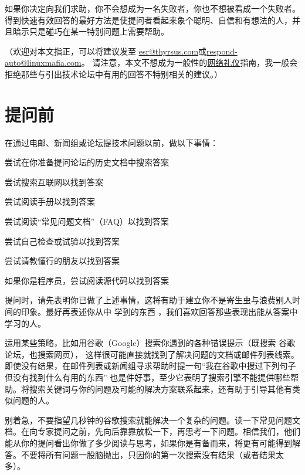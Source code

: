 如果你决定向我们求助，你不会想成为一名失败者，你也不想被看成一个失败者。得到快速有效回答的最好方法是使提问者看起来象个聪明、自信和有想法的人，并且暗示只是碰巧在某一特别问题上需要帮助。

（欢迎对本文指正，可以将建议发至 \href{mailto:esr@thyrsus.com}{esr@thyrsus.com}或\href{mailto:esr@thyrsus.com}{respond-auto@linuxmafia.com}。 请注意，本文不想成为一般性的\href{http://www.ietf.org/rfc/rfc1855.txt}{网络礼仪}指南，我一般会拒绝那些与引出技术论坛中有用的回答不特别相关的建议。）




\section{提问前}


在通过电邮、新闻组或论坛提技术问题以前，做以下事情：

\begin{compactenum}
\item 尝试在你准备提问论坛的历史文档中搜索答案
\item 尝试搜索互联网以找到答案
\item 尝试阅读手册以找到答案
\item 尝试阅读“常见问题文档”（FAQ）以找到答案
\item 尝试自己检查或试验以找到答案
\item 尝试请教懂行的朋友以找到答案
\item 如果你是程序员，尝试阅读源代码以找到答案
\end{compactenum}



提问时，请先表明你已做了上述事情，这将有助于建立你不是寄生虫与浪费别人时间的印象。最好再表述你从中 学到的东西 ，我们喜欢回答那些表现出能从答案中学习的人。

运用某些策略，比如用谷歌（Google）搜索你遇到的各种错误提示（既搜索 谷歌论坛，也搜索网页）， 这样很可能直接就找到了解决问题的文档或邮件列表线索。 即使没有结果，在邮件列表或新闻组寻求帮助时提一句“我在谷歌中搜过下列句子但没有找到什么有用的东西” 也是件好事，至少它表明了搜索引擎不能提供哪些帮助。将搜索关键词与你的问题及可能的解决方案联系起来，还有助于引导其他有类似问题的人。

别着急，不要指望几秒钟的谷歌搜索就能解决一个复杂的问题。读一下常见问题文档。在向专家提问之前，先向后靠靠放松一下，再思考一下问题。相信我们，他们能从你的提问看出你做了多少阅读与思考，如果你是有备而来，将更有可能得到解答。不要将所有问题一股脑抛出，只因你的第一次搜索没有结果（或者结果太多）。

